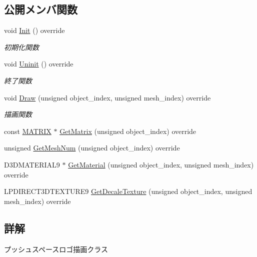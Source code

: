 \subsection*{公開メンバ関数}
\begin{DoxyCompactItemize}
\item 
void \mbox{\hyperlink{class_push_space_logo_draw_a7ad3fe53d9bda4ea16c958bc102ff54e}{Init}} () override
\begin{DoxyCompactList}\small\item\em 初期化関数 \end{DoxyCompactList}\item 
void \mbox{\hyperlink{class_push_space_logo_draw_a79021c1df43968d6008de74126d53fba}{Uninit}} () override
\begin{DoxyCompactList}\small\item\em 終了関数 \end{DoxyCompactList}\item 
void \mbox{\hyperlink{class_push_space_logo_draw_a647dddefc43d66cb3c720ee8fbb6a783}{Draw}} (unsigned object\+\_\+index, unsigned mesh\+\_\+index) override
\begin{DoxyCompactList}\small\item\em 描画関数 \end{DoxyCompactList}\item 
const \mbox{\hyperlink{_vector3_d_8h_a032295cd9fb1b711757c90667278e744}{M\+A\+T\+R\+IX}} $\ast$ \mbox{\hyperlink{class_push_space_logo_draw_a1ab6229ba2d68b730797f5016c99f359}{Get\+Matrix}} (unsigned object\+\_\+index) override
\item 
unsigned \mbox{\hyperlink{class_push_space_logo_draw_a9a40fca53e23b9970a7c5decaa3d2da6}{Get\+Mesh\+Num}} (unsigned object\+\_\+index) override
\item 
D3\+D\+M\+A\+T\+E\+R\+I\+A\+L9 $\ast$ \mbox{\hyperlink{class_push_space_logo_draw_a0734eed4096afb12e6c9ef1f4d82b9d8}{Get\+Material}} (unsigned object\+\_\+index, unsigned mesh\+\_\+index) override
\item 
L\+P\+D\+I\+R\+E\+C\+T3\+D\+T\+E\+X\+T\+U\+R\+E9 \mbox{\hyperlink{class_push_space_logo_draw_a4990a9f5662af324f2632e8647cbdde4}{Get\+Decale\+Texture}} (unsigned object\+\_\+index, unsigned mesh\+\_\+index) override
\end{DoxyCompactItemize}


\subsection{詳解}
プッシュスペースロゴ描画クラス 

